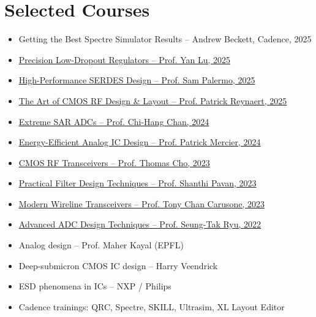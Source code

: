 \documentclass[11pt,a4paper]{article}
\begin{document}
	\section*{Selected Courses}
	\begin{itemize}
		\item Getting the Best Spectre Simulator Results -- Andrew Beckett, Cadence, 2025
		\item \href{https://www.linkedin.com/in/catalinlazar/details/featured/1770399649634/single-media-viewer?type=DOCUMENT&profileId=ACoAAABWgUwBQR0tFyQ9UTnHbgKpClf9KcONx88}{Precision Low-Dropout Regulators -- Prof. Yan Lu, 2025}
		\item \href{https://www.linkedin.com/in/catalinlazar/details/featured/1770399502852/single-media-viewer?type=DOCUMENT&profileId=ACoAAABWgUwBQR0tFyQ9UTnHbgKpClf9KcONx88}{High-Performance SERDES Design -- Prof. Sam Palermo, 2025}
		\item \href{https://www.linkedin.com/in/catalinlazar/details/featured/1770399336322/single-media-viewer?type=DOCUMENT&profileId=ACoAAABWgUwBQR0tFyQ9UTnHbgKpClf9KcONx88}{The Art of CMOS RF Design \& Layout -- Prof. Patrick Reynaert, 2025}
		\item \href{https://www.linkedin.com/in/catalinlazar/details/featured/1770399006787/single-media-viewer?type=DOCUMENT&profileId=ACoAAABWgUwBQR0tFyQ9UTnHbgKpClf9KcONx88}{Extreme SAR ADCs -- Prof. Chi-Hang Chan, 2024}
		\item \href{https://www.linkedin.com/in/catalinlazar/details/featured/1770398798600/single-media-viewer?type=DOCUMENT&profileId=ACoAAABWgUwBQR0tFyQ9UTnHbgKpClf9KcONx88}{Energy-Efficient Analog IC Design -- Prof. Patrick Mercier, 2024}
		\item \href{https://www.linkedin.com/in/catalinlazar/details/featured/1770398631011/single-media-viewer?type=DOCUMENT&profileId=ACoAAABWgUwBQR0tFyQ9UTnHbgKpClf9KcONx88}{CMOS RF Transceivers -- Prof. Thomas Cho, 2023}
		\item \href{https://www.linkedin.com/in/catalinlazar/details/featured/1770397800892/single-media-viewer?type=DOCUMENT&profileId=ACoAAABWgUwBQR0tFyQ9UTnHbgKpClf9KcONx88}{Practical Filter Design Techniques -- Prof. Shanthi Pavan, 2023}
		\item \href{https://www.linkedin.com/in/catalinlazar/details/featured/1770397647267/single-media-viewer?type=DOCUMENT&profileId=ACoAAABWgUwBQR0tFyQ9UTnHbgKpClf9KcONx88}{Modern Wireline Transceivers -- Prof. Tony Chan Carusone, 2023}
		\item \href{https://www.linkedin.com/in/catalinlazar/details/featured/1770397508647/single-media-viewer?type=DOCUMENT&profileId=ACoAAABWgUwBQR0tFyQ9UTnHbgKpClf9KcONx88}{Advanced ADC Design Techniques -- Prof. Seung-Tak Ryu, 2022}
		\item Analog design -- Prof. Maher Kayal (EPFL)
		\item Deep-submicron CMOS IC design -- Harry Veendrick
		\item ESD phenomena in ICs -- NXP / Philips
		\item Cadence trainings: QRC, Spectre, SKILL, Ultrasim, XL Layout Editor
	\end{itemize}
	
\end{document}
